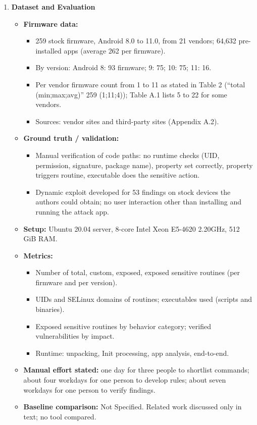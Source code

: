 \documentclass[11pt,a4paper]{article}
\newcommand{\entrypart}[1]{\textbf{\color{accent}#1}\par\vspace{2pt}}
\begin{document}
\begin{enumerate}
    \item \entrypart{Dataset and Evaluation}
    \begin{itemize}[leftmargin=*, itemsep=1pt, topsep=2pt]
        \item \textbf{Firmware data:}
        \begin{itemize}[itemsep=0pt]
            \item 259 stock firmware, Android 8.0 to 11.0, from 21 vendors; 64,632 pre-installed apps (average 262 per firmware).
            \item By version: Android 8: 93 firmware; 9: 75; 10: 75; 11: 16.
            \item Per vendor firmware count from 1 to 11 as stated in Table 2 (``total (min;max;avg)'' 259 (1;11;4)); Table A.1 lists 5 to 22 for some vendors.
            \item Sources: vendor sites and third-party sites (Appendix A.2).
        \end{itemize}
        \item \textbf{Ground truth / validation:}
        \begin{itemize}[itemsep=0pt]
            \item Manual verification of code paths: no runtime checks (UID, permission, signature, package name), property set correctly, property triggers routine, executable does the sensitive action.
            \item Dynamic exploit developed for 53 findings on stock devices the authors could obtain; no user interaction other than installing and running the attack app.
        \end{itemize}
        \item \textbf{Setup:} Ubuntu 20.04 server, 8-core Intel Xeon E5-4620 2.20GHz, 512 GiB RAM.
        \item \textbf{Metrics:}
        \begin{itemize}[itemsep=0pt]
            \item Number of total, custom, exposed, exposed sensitive routines (per firmware and per version).
            \item UIDs and SELinux domains of routines; executables used (scripts and binaries).
            \item Exposed sensitive routines by behavior category; verified vulnerabilities by impact.
            \item Runtime: unpacking, Init processing, app analysis, end-to-end.
        \end{itemize}
        \item \textbf{Manual effort stated:} one day for three people to shortlist commands; about four workdays for one person to develop rules; about seven workdays for one person to verify findings.
        \item \textbf{Baseline comparison:} Not Specified. Related work discussed only in text; no tool compared.
    \end{itemize}


\end{enumerate}
\end{document}
